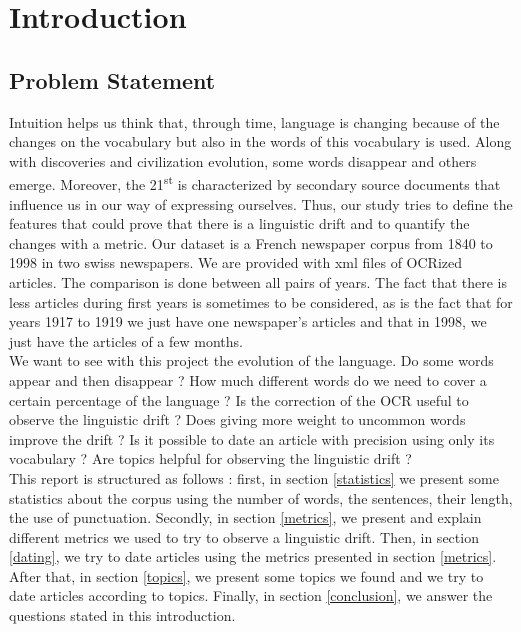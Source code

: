 \section{Introduction}

\subsection{Problem Statement}
Intuition helps us think that, through time, language is changing because of the changes on the vocabulary but also in the words of this vocabulary is used.
Along with discoveries and civilization evolution, some words disappear and others emerge. Moreover, the 21\textsuperscript{st} is characterized by secondary source documents that influence us in our way of expressing ourselves. Thus, our study tries to define the features that could prove that there is a linguistic drift and to quantify the changes with a metric.
Our dataset is a French newspaper corpus from 1840 to 1998 in two swiss newspapers. We are provided with xml files of OCRized articles. The comparison is done between all pairs of years. The fact that there is less articles during first years is sometimes to be considered, as is the fact that for years 1917 to 1919 we just have one newspaper's articles and that in 1998, we just have the articles of a few months.\\

We want to see with this project the evolution of the language. Do some words appear and then disappear ? How much different words do we need to cover a certain percentage of the language ? Is the correction of the OCR useful to observe the linguistic drift ? Does giving more weight to uncommon words improve the drift ? Is it possible to date an article with precision using only its vocabulary ? Are topics helpful for observing the linguistic drift ?\\

This report is structured as follows : first, in section \ref{statistics} we present some statistics about the corpus using the number of words, the sentences, their length, the use of punctuation. Secondly, in section \ref{metrics}, we present and explain different metrics we used to try to observe a linguistic drift. Then, in section \ref{dating}, we try to date articles using the metrics presented in section \ref{metrics}. After that, in section \ref{topics}, we present some topics we found and we try to date articles according to topics. Finally, in section \ref{conclusion}, we answer the questions stated in this introduction.
